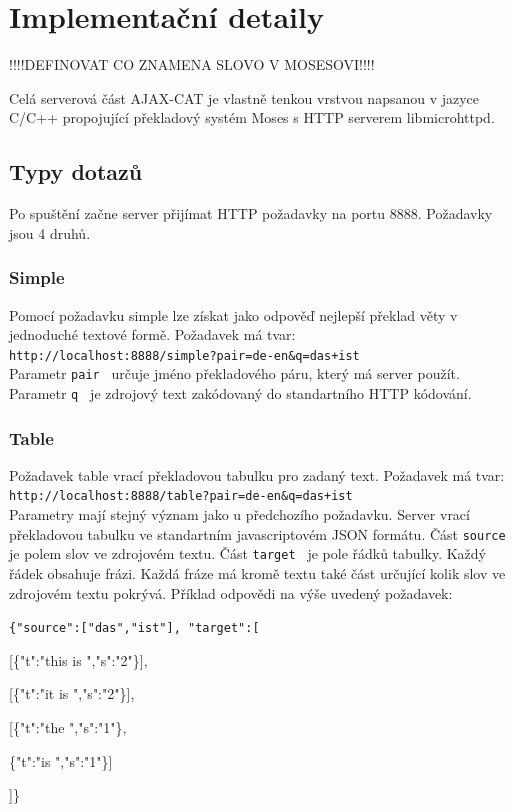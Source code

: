 \documentclass[12pt,a4paper]{report}
\begin{document}
\section{Implementační detaily}

!!!!DEFINOVAT CO ZNAMENA SLOVO V MOSESOVI!!!!


Celá serverová část AJAX-CAT je vlastně tenkou vrstvou napsanou v jazyce C/C++ propojující překladový systém Moses s HTTP serverem libmicrohttpd.

\subsection{Typy dotazů}
Po spuštění začne server přijímat HTTP požadavky na portu 8888. Požadavky jsou 4 druhů.

\subsubsection{Simple}
Pomocí požadavku simple lze získat jako odpověď nejlepší překlad věty v jednoduché textové formě. Požadavek má tvar: \\

{\tt http://localhost:8888/simple?pair=de-en\&q=das+ist } \\

Parametr {\tt pair } určuje jméno překladového páru, který má server použít. Parametr {\tt q } je zdrojový text zakódovaný do standartního HTTP kódování.

\subsubsection{Table}
Požadavek table vrací překladovou tabulku pro zadaný text. Požadavek má tvar: \\

{\tt http://localhost:8888/table?pair=de-en\&q=das+ist } \\

Parametry mají stejný význam jako u předchozího požadavku. Server vrací překladovou tabulku ve standartním javascriptovém JSON formátu. Část {\tt source } je polem slov ve zdrojovém textu. Část {\tt target } je pole řádků tabulky. Každý řádek obsahuje frázi. Každá fráze má kromě textu také část určující kolik slov ve zdrojovém textu pokrývá. Příklad odpovědi na výše uvedený požadavek: \\

{\tt \{"source":["das","ist"],
"target":[ 

[\{"t":"this is ","s":"2"\}],
 
[\{"t":"it is ","s":"2"\}],
 
[\{"t":"the ","s":"1"\},

\{"t":"is ","s":"1"\}]

]\} 

}
\end{document}
